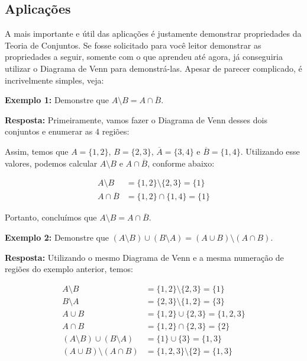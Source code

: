   \subsection{Aplicações}
  A mais importante e útil das aplicações é justamente demonstrar propriedades da Teoria de Conjuntos. Se fosse solicitado para você leitor demonstrar as propriedades a seguir, somente com o que aprendeu até agora, já conseguiria utilizar o Diagrama de Venn para demonstrá-las. Apesar de parecer complicado, é incrivelmente simples, veja:

  \textbf{Exemplo 1:} Demonstre que $A \setminus B = A \cap \overline B$.

  \textbf{Resposta:} Primeiramente, vamos fazer o Diagrama de Venn desses dois conjuntos e enumerar as $4$ regiões:


  Assim, temos que $A=\{1,2\}$, $B=\{2,3\}$, $\overline A=\{3,4\}$ e $\overline B=\{1,4\}$. Utilizando esse valores, podemos calcular $A \setminus B$ e $A \cap \overline B$, conforme abaixo:

  \begin{equation*}
    \begin{aligned}
      A \setminus B &= \{1,2\} \setminus \{2,3\} = \{1\}\\
      A \cap \overline B &= \{1,2\} \cap \{1,4\} = \{1\}
    \end{aligned}
  \end{equation*}

  Portanto, concluímos que $A \setminus B = A \cap \overline B$.

  \textbf{Exemplo 2:} Demonstre que $(A \setminus B) \cup (B \setminus A) = (A \cup B) \setminus (A \cap B)$.

  \textbf{Resposta:} Utilizando o mesmo Diagrama de Venn e a mesma numeração de regiões do exemplo anterior, temos:

  \begin{equation*}
    \begin{aligned}
      A \setminus B &= \{1,2\} \setminus \{2,3\} = \{1\}\\
      B \setminus A &= \{2,3\} \setminus \{1,2\} = \{3\}\\
      A \cup B &= \{1,2\} \cup \{2,3\} = \{1,2,3\}\\
      A \cap B &= \{1,2\} \cap \{2,3\} = \{2\}\\
      (A \setminus B) \cup (B \setminus A) &= \{1\} \cup \{3\} = \{1,3\}\\
      (A \cup B) \setminus (A \cap B) &= \{1,2,3\} \setminus \{2\} = \{1,3\}
    \end{aligned}
  \end{equation*}

